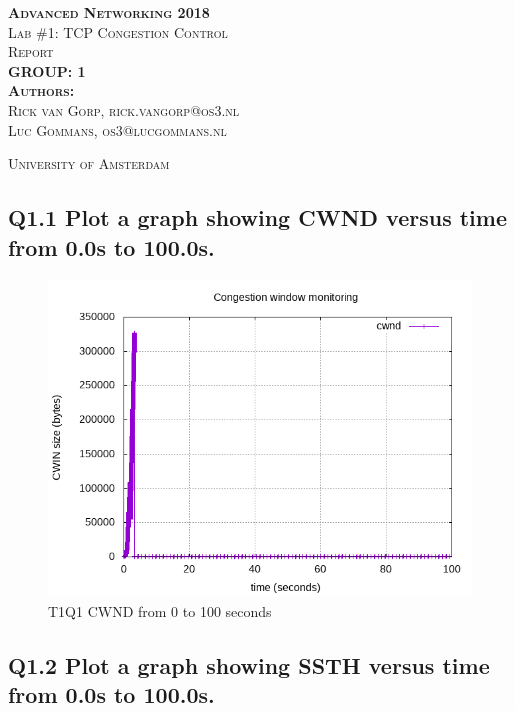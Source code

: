 \documentclass{article}
\begin{document}
\begin{titlepage}
\begin{center}
\textsc{\huge \bfseries Advanced Networking 2018}\\[1.5cm]
\textsc{\large Lab \#1: TCP Congestion Control}\\[1.5cm]
\textsc{\huge Report}\\[1.5cm]
\textsc{\huge \bfseries GROUP: 1}\\[1.5cm]
\textsc{\large{\textbf{Authors:}\\ Rick van Gorp, rick.vangorp@os3.nl\\ Luc Gommans, os3@lucgommans.nl}}

\textsc{\large University of Amsterdam}
\end{center}
\end{titlepage}

\subsection{Q1.1 Plot a graph showing CWND versus time from 0.0s to 100.0s.}

\begin{figure}[H]
	\includegraphics{lab1-group1-task1-question1.png}
	\caption{T1Q1 CWND from 0 to 100 seconds}
\end{figure}


\subsection{Q1.2 Plot a graph showing SSTH versus time from 0.0s to 100.0s.}
\end{document}
